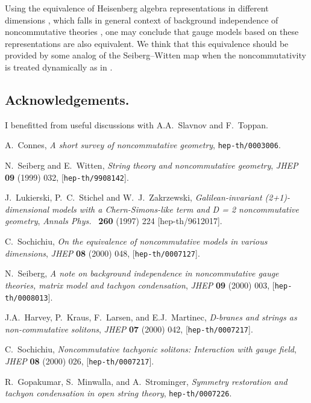 \documentclass[a4paper]{amsart}
\begin{document}
Using the equivalence of Heisenberg algebra representations in
different dimensions \cite{Sochichiu:2000bg}, which falls in
general context of background independence of noncommutative
theories \cite{Seiberg:2000zk}, one may conclude that gauge models
based on these representations are also equivalent. We think that
this equivalence should be provided by some analog of the
Seiberg--Witten map \cite{Seiberg:1999vs} when the
noncommutativity is treated dynamically as in
\cite{Harvey:2000jt,Sochichiu:2000rm,Gopakumar:2000xx}.

\subsection*{Acknowledgements.} I benefitted from useful
discussions with A.A.~Slavnov and F.~Toppan.
\providecommand{\href}[2]{#2}\begingroup\raggedright\begin{thebibliography}{1}

A.~Connes, {\it A short survey of noncommutative geometry},
  \href{http://xxx.lanl.gov/abs/hep-th/0003006}{{\tt hep-th/0003006}}.

N.~Seiberg and E.~Witten, {\it String theory and noncommutative geometry},
  {\em JHEP} {\bf 09} (1999) 032,
  [\href{http://xxx.lanl.gov/abs/hep-th/9908142}{{\tt hep-th/9908142}}].

J.~Lukierski, P.~C.~Stichel and W.~J.~Zakrzewski, {\it Galilean-invariant
(2+1)-dimensional models with a Chern-Simons-like  term and D = 2 noncommutative
geometry}, {\em Annals Phys.\ }  {\bf 260} (1997) 224 [hep-th/9612017].

C.~Sochichiu, {\it On the equivalence of noncommutative models in various
  dimensions},  {\em JHEP} {\bf 08} (2000) 048,
  [\href{http://xxx.lanl.gov/abs/hep-th/0007127}{{\tt hep-th/0007127}}].

N.~Seiberg, {\it A note on background independence in noncommutative gauge
  theories, matrix model and tachyon condensation},  {\em JHEP} {\bf 09} (2000)
  003, [\href{http://xxx.lanl.gov/abs/hep-th/0008013}{{\tt hep-th/0008013}}].

J.A.~Harvey, P.~Kraus, F.~Larsen, and E.J.~Martinec, {\it D-branes
and strings as non-commutative solitons},  {\em JHEP} {\bf 07}
(2000) 042,
  [\href{http://xxx.lanl.gov/abs/hep-th/0007217}{{\tt hep-th/0007217}}].

C.~Sochichiu, {\it Noncommutative tachyonic solitons: Interaction
with gauge
  field},  {\em JHEP} {\bf 08} (2000) 026,
  [\href{http://xxx.lanl.gov/abs/hep-th/0007217}{{\tt hep-th/0007217}}].

R.~Gopakumar, S.~Minwalla, and A.~Strominger, {\it Symmetry restoration and
tachyon condensation in open string theory},
  \href{http://xxx.lanl.gov/abs/hep-th/0007226}{{\tt hep-th/0007226}}.

\end{thebibliography}\endgroup
\end{document}
